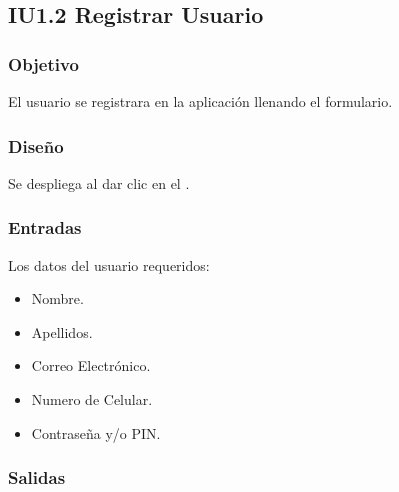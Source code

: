 \newpage
\subsection{IU1.2 Registrar Usuario}

\subsubsection{Objetivo}
	El usuario se  registrara en la aplicación llenando el formulario.  

\subsubsection{Diseño}
	Se despliega al dar clic en el .


\subsubsection{Entradas}
Los datos del usuario requeridos:
\begin{itemize}	
	\item Nombre.
	\item Apellidos.
	\item Correo Electrónico.
	\item Numero de Celular.
	\item Contraseña y/o PIN.
\end{itemize}

\subsubsection{Salidas}
\begin{Citemize}
	\item {}
	\item {}
	\item {}
	\item {}
\end{Citemize} 